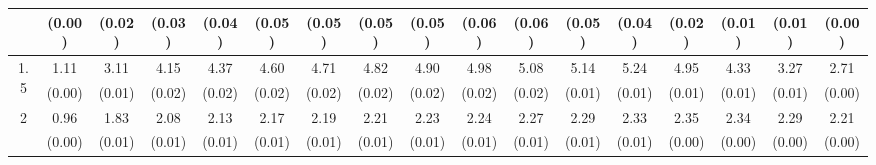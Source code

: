 \documentclass[12pt]{article}  %
\theoremstyle{plain}
\begin{document}
\begin{sidewaystable}[htbp]
\begin{tabular}{ccccccccccccccccc}
                       & (0.00)& (0.02)& (0.03)& (0.04)& (0.05)& (0.05)& (0.05)& (0.05)& (0.06)&  (0.06)&  (0.05)&  (0.04)&  (0.02)&  (0.01)&  (0.01) &   (0.00)\\ \hline                                                                                                                                                                                                                                                                                    
\multirow{2}{*}{1.5}  &1.11& 3.11 & 4.15 & 4.37  & 4.60 &  4.71  & 4.82  & 4.90  & 4.98  & 5.08&  5.14 & 5.24 & 4.95 & 4.33  &3.27 & 2.71\\
                      &  (0.00)& (0.01)& (0.02)& (0.02)& (0.02)& (0.02)& (0.02)& (0.02)& (0.02)&  (0.02)&  (0.01)&  (0.01)&  (0.01)&  (0.01)&  (0.01)&     (0.00)\\ \hline                                                                                                                                                                                                                                                                                    
\multirow{2}{*}{2}  &0.96& 1.83 & 2.08 & 2.13 &  2.17 &  2.19  & 2.21  & 2.23 &  2.24  & 2.27 & 2.29 & 2.33&  2.35 & 2.34 & 2.29 & 2.21\\
                      &  (0.00)& (0.01)& (0.01)& (0.01)& (0.01)& (0.01)& (0.01)& (0.01)& (0.01)&  (0.01)&  (0.01)&  (0.01)&  (0.00)&  (0.00)&  (0.00)&     (0.00)\\ \hline                                                                                                                                                                                                                                                                                    
\end{tabular}
\end{sidewaystable}
\end{document}
